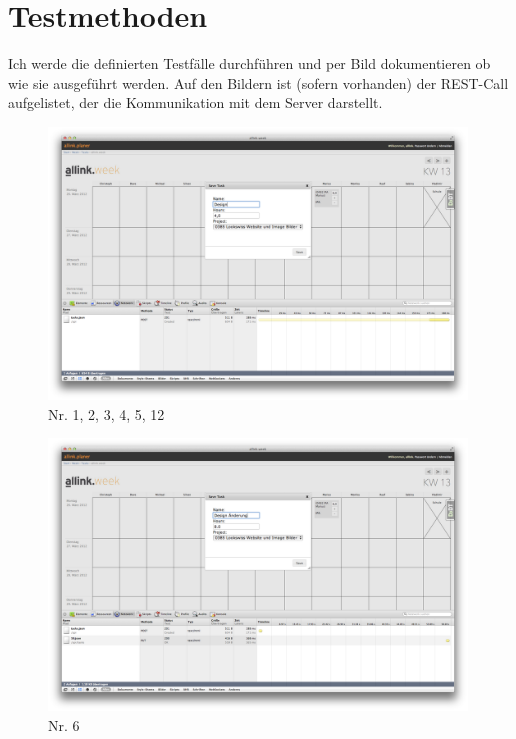 \section{Testmethoden}
Ich werde die definierten Testfälle durchführen und per Bild dokumentieren ob wie sie ausgeführt werden.
Auf den Bildern ist (sofern vorhanden) der REST-Call aufgelistet, der die Kommunikation mit dem Server darstellt.
\clearpage
\begin{figure}[htbp]
    \centering
        \includegraphics[width=0.99\textwidth,angle=0]{bilder/testing/Task_erstellen.png}
    \caption{Nr. 1, 2, 3, 4, 5, 12}
    \label{fig:bilder_testing_Task erstellen}
\end{figure}
\begin{figure}[htbp]
    \centering
        \includegraphics[width=0.99\textwidth,angle=0]{bilder/testing/Task_bearbeiten.png}
    \caption{Nr. 6}
    \label{fig:bilder_testing_Task_bearbeiten}
\end{figure}
